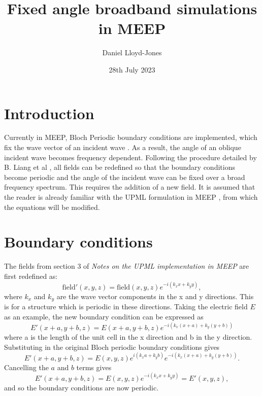\documentclass{article}
\title{Fixed angle broadband simulations in MEEP}
\author{Daniel Lloyd-Jones }
\date{28th July 2023}
\begin{document}
\maketitle

\section{Introduction}
Currently in MEEP, Bloch Periodic boundary conditions are implemented, which fix the wave vector of an incident wave \cite{MEEP}. As a result, the angle of an oblique incident wave becomes frequency dependent. Following the procedure detailed by B. Liang et al \cite{BFAST}, all fields can be redefined so that the boundary conditions become periodic and the angle of the incident wave can be fixed over a broad frequency spectrum. This requires the addition of a new field. It is assumed that the reader is already familiar with the UPML formulation in MEEP \cite{UPML}, from which the equations will be modified.

\section{Boundary conditions}
The fields from section 3 of \emph{Notes on the UPML implementation in MEEP} \cite{UPML} are first redefined as:
\begin{equation} \label{redef}
\text{field}'(x,y,z) = \text{field}(x,y,z)e^{-i(k_{x}x+k_{y}y)},
\end{equation}
where $k_{x}$ and $k_{y}$ are the wave vector components in the x and y directions. This is for a structure which is periodic in these directions. Taking the electric field $E$ as an example, the new boundary condition can be expressed as
\begin{equation}
E'(x+a,y+b,z) = E(x+a,y+b,z)e^{-i(k_{x}(x+a)+k_{y}(y+b))}
\end{equation}
where a is the length of the unit cell in the x direction and b in the y direction. Substituting in the original Bloch periodic boundary conditions gives
\begin{equation}
E'(x+a,y+b,z) = E(x,y,z)e^{i(k_{x}a+k_{y}b)}e^{-i(k_{x}(x+a)+k_{y}(y+b))}.
\end{equation}
Cancelling the $a$ and $b$ terms gives
\begin{equation}
E'(x+a,y+b,z) =E(x,y,z)e^{-i(k_{x}x+k_{y}y)}=E'(x,y,z),
\end{equation}
and so the boundary conditions are now periodic.
\end{document}
